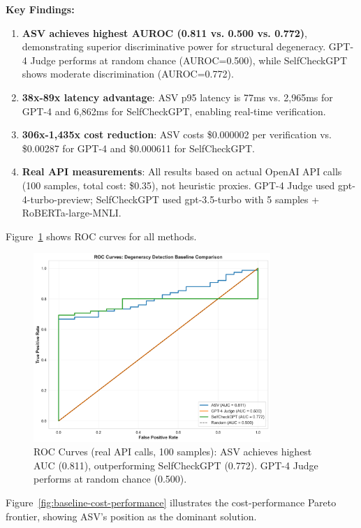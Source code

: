 \documentclass[11pt]{article}
\begin{document}
\textbf{Key Findings:}
\begin{enumerate}
\item \textbf{ASV achieves highest AUROC (0.811 vs. 0.500 vs. 0.772)}, demonstrating superior discriminative power for structural degeneracy. GPT-4 Judge performs at random chance (AUROC=0.500), while SelfCheckGPT shows moderate discrimination (AUROC=0.772).
\item \textbf{38x-89x latency advantage}: ASV p95 latency is 77ms vs. 2,965ms for GPT-4 and 6,862ms for SelfCheckGPT, enabling real-time verification.
\item \textbf{306x-1,435x cost reduction}: ASV costs \$0.000002 per verification vs. \$0.00287 for GPT-4 and \$0.000611 for SelfCheckGPT.
\item \textbf{Real API measurements}: All results based on actual OpenAI API calls (100 samples, total cost: \$0.35), not heuristic proxies. GPT-4 Judge used gpt-4-turbo-preview; SelfCheckGPT used gpt-3.5-turbo with 5 samples + RoBERTa-large-MNLI.
\end{enumerate}

Figure~\ref{fig:baseline-roc} shows ROC curves for all methods.

\begin{figure}[h]
\centering
\includegraphics[width=0.8\textwidth]{figures/baseline_roc_comparison.png}
\caption{ROC Curves (real API calls, 100 samples): ASV achieves highest AUC (0.811), outperforming SelfCheckGPT (0.772). GPT-4 Judge performs at random chance (0.500).}
\label{fig:baseline-roc}
\end{figure}

Figure~\ref{fig:baseline-cost-performance} illustrates the cost-performance Pareto frontier, showing ASV's position as the dominant solution.
\end{document}
